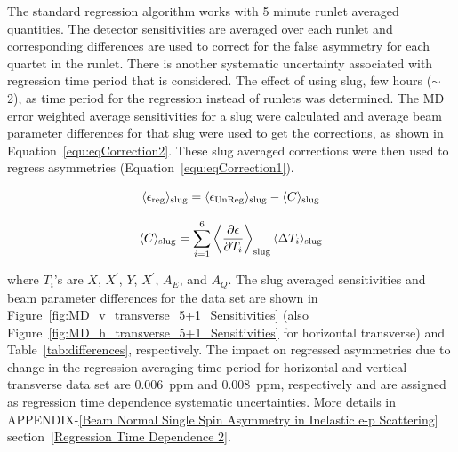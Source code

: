 The standard regression algorithm works with 5 minute runlet averaged quantities. The detector sensitivities are averaged over each runlet and corresponding differences are used to correct for the false asymmetry for each quartet in the runlet. There is another systematic uncertainty associated with regression time period that is considered.
The effect of using slug, few hours ($\sim$2), as time period for the regression instead of runlets was determined. 
The MD error weighted average sensitivities for a slug were calculated and average beam parameter differences for that slug were used to get the corrections, as shown in Equation~\ref{equ:eqCorrection2}. These slug averaged corrections were then used to regress asymmetries (Equation~\ref{equ:eqCorrection1}). 

\begin{equation} \label{equ:eqCorrection1}
\langle \epsilon_{\rm reg}\rangle_{\rm slug} = \langle \epsilon_{\rm UnReg}\rangle_{\rm slug} - \langle C\rangle_{\rm slug}
\end{equation}

\begin{equation} \label{equ:eqCorrection2}
\langle C\rangle_{\rm slug} = \sum^{6}_{i=1} \left\langle \frac{\partial\epsilon }{\partial T_{i}}\right\rangle_{\rm slug} \langle\Delta T_{i}\rangle_{\rm slug}
\end{equation}

where $T_{i}$'s are $X$, $X^{\prime}$, $Y$, $X^{\prime}$, $A_{E}$, and  $A_{Q}$. The slug averaged sensitivities and beam parameter differences for the data set are shown in Figure~\ref{fig:MD_v_transverse_5+1_Sensitivities} (also Figure~\ref{fig:MD_h_transverse_5+1_Sensitivities} for horizontal transverse) and Table~\ref{tab:differences}, respectively.
The impact on regressed asymmetries due to change in the regression averaging time period for horizontal and vertical transverse data set are 0.006~ppm and 0.008~ppm, respectively and are assigned as regression time dependence systematic uncertainties. More details in APPENDIX-\ref{Beam Normal Single Spin Asymmetry in Inelastic e-p Scattering} section~\ref{Regression Time Dependence 2}.

